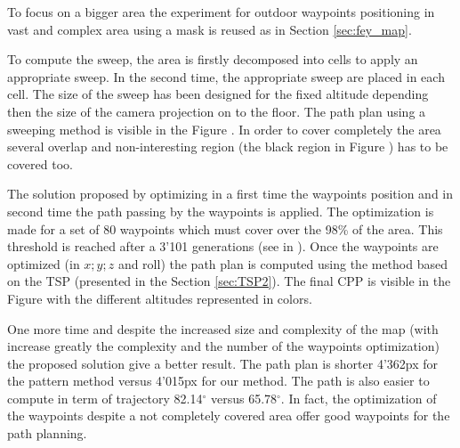 To focus on a bigger area the experiment for outdoor waypoints positioning in vast and complex area using a mask  is reused as in Section \ref{sec:fey_map}. %

To compute the sweep, the area is firstly decomposed into cells to apply an appropriate sweep. In the second time, the appropriate sweep are placed in each cell. The size of the sweep has been designed for the fixed altitude depending then the size of the camera projection on to the floor.%
The path plan using a sweeping method is visible in the Figure . In order to cover completely the area several overlap and non-interesting region (the black region in Figure ) has to be covered too. 

The solution proposed by optimizing in a first time the waypoints position and in second time the path passing by the waypoints is applied. The optimization is made for a set of 80 waypoints which must cover over the 98\% of the area. This threshold is reached after a 3'101 generations (see in ). Once the waypoints are optimized (in $x;y;z$ and roll) the path plan is computed using the method based on the TSP (presented in the Section \ref{sec:TSP2}). The final CPP is visible in the Figure  with the different altitudes represented in colors.

One more time and despite the increased size and complexity of the map (with increase greatly the complexity and the number of the waypoints optimization) the proposed solution give a better result. The path plan is shorter 4'362px for the pattern method versus 4'015px for our method. The path is also easier to compute in term of trajectory 82.14$^\circ$ versus 65.78$^\circ$.
In fact, the optimization of the waypoints despite a not completely covered area offer good waypoints for the path planning. %

  

